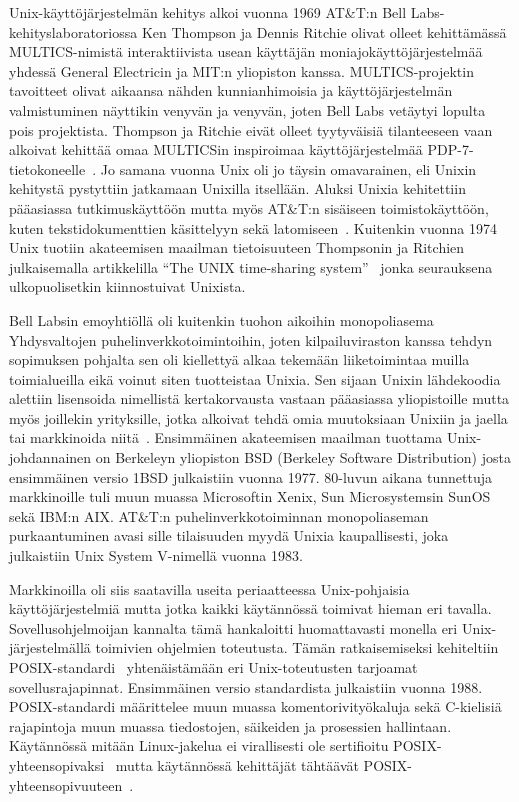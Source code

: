 Unix-käyttöjärjestelmän kehitys alkoi vuonna 1969 AT\&T:n Bell Labs-kehityslaboratoriossa
Ken Thompson ja Dennis Ritchie olivat olleet kehittämässä MULTICS-nimistä interaktiivista usean käyttäjän moniajokäyttöjärjestelmää yhdessä General Electricin ja MIT:n yliopiston kanssa.
MULTICS-projektin tavoitteet olivat aikaansa nähden kunnianhimoisia ja käyttöjärjestelmän valmistuminen näyttikin venyvän ja venyvän, joten Bell Labs vetäytyi lopulta pois projektista.
Thompson ja Ritchie eivät olleet tyytyväisiä tilanteeseen vaan alkoivat kehittää omaa MULTICSin inspiroimaa käyttöjärjestelmää PDP-7-tietokoneelle~\cite{UnixHistoryBook}.
Jo samana vuonna Unix oli jo täysin omavarainen, eli Unixin kehitystä pystyttiin jatkamaan Unixilla itsellään.
Aluksi Unixia kehitettiin pääasiassa tutkimuskäyttöön mutta myös AT\&T:n sisäiseen toimistokäyttöön,
kuten tekstidokumenttien käsittelyyn sekä latomiseen~\cite{UnixFsBook}.
Kuitenkin vuonna 1974 Unix tuotiin akateemisen maailman tietoisuuteen Thompsonin ja Ritchien julkaisemalla artikkelilla ``The UNIX time-sharing system''~\cite{UnixPaper} jonka seurauksena ulkopuolisetkin kiinnostuivat Unixista.

Bell Labsin emoyhtiöllä oli kuitenkin tuohon aikoihin monopoliasema Yhdysvaltojen puhelinverkkotoimintoihin,
joten kilpailuviraston kanssa tehdyn sopimuksen pohjalta sen oli kiellettyä alkaa tekemään liiketoimintaa muilla toimialueilla eikä voinut siten tuotteistaa Unixia.
Sen sijaan Unixin lähdekoodia alettiin lisensoida nimellistä kertakorvausta vastaan pääasiassa yliopistoille mutta myös joillekin yrityksille,
jotka alkoivat tehdä omia muutoksiaan Unixiin ja jaella tai markkinoida niitä~\cite{UnixFsBook}.
Ensimmäinen akateemisen maailman tuottama Unix-johdannainen on Berkeleyn yliopiston BSD (Berkeley Software Distribution) josta ensimmäinen versio 1BSD julkaistiin vuonna 1977.
80-luvun aikana tunnettuja markkinoille tuli muun muassa Microsoftin Xenix, Sun Microsystemsin SunOS sekä IBM:n AIX.
AT\&T:n puhelinverkkotoiminnan monopoliaseman purkaantuminen avasi sille tilaisuuden myydä Unixia kaupallisesti,
joka julkaistiin Unix System V-nimellä vuonna 1983.

Markkinoilla oli siis saatavilla useita periaatteessa Unix-pohjaisia käyttöjärjestelmiä mutta jotka kaikki käytännössä toimivat hieman eri tavalla.
Sovellusohjelmoijan kannalta tämä hankaloitti huomattavasti monella eri Unix-järjestelmällä toimivien ohjelmien toteutusta.
Tämän ratkaisemiseksi kehiteltiin POSIX-standardi~\cite{PosixSpec} yhtenäistämään eri Unix-toteutusten tarjoamat sovellusrajapinnat.
Ensimmäinen versio standardista julkaistiin vuonna 1988.
POSIX-standardi määrittelee muun muassa komentorivityökaluja sekä C-kielisiä rajapintoja muun muassa tiedostojen, säikeiden ja prosessien hallintaan.
Käytännössä mitään Linux-jakelua ei virallisesti ole sertifioitu POSIX-yhteensopivaksi~\cite{PosixLinuxCompat}
mutta käytännössä kehittäjät tähtäävät POSIX-yhteensopivuuteen~\cite{LinuxKernelBook}.


